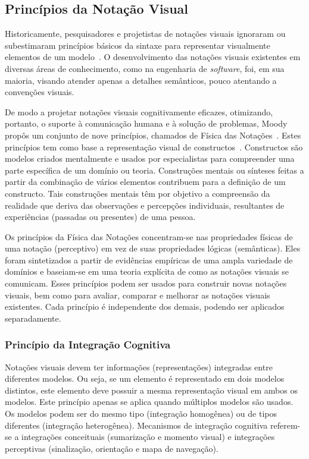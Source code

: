 \subsection{Princípios da Notação Visual}\label{2-fundamentacao-notacao-visual-principios}

Historicamente, pesquisadores e projetistas de notações visuais ignoraram ou subestimaram princípios básicos da sintaxe para representar visualmente elementos de um modelo~\cite{MOODY-2009-Physics-Notation}. O desenvolvimento das notações visuais existentes em diversas áreas de conhecimento, como na engenharia de \textit{software}, foi, em sua maioria, visando atender apenas a detalhes semânticos, pouco atentando a convenções visuais.

De modo a projetar notações visuais cognitivamente eficazes, otimizando, portanto, o suporte à comunicação humana e à solução de problemas, Moody propôs um conjunto de nove princípios, chamados de Física das Notações~\cite{MOODY-2009-Physics-Notation}. Estes princípios tem como base a representação visual de constructos~\cite{MOODY-2009-Physics-Notation, POPESCU-WEGMANN-2014-Using-Physics-of-Notation-SEAM}. Constructos são modelos criados mentalmente e usados por especialistas para compreender uma parte específica de um domínio ou teoria. Construções mentais ou sínteses feitas a partir da combinação de vários elementos contribuem para a definição de um constructo. Tais construções mentais têm por objetivo a compreensão da realidade que deriva das observações e percepções individuais, resultantes de experiências (passadas ou presentes) de uma pessoa.

Os princípios da Física das Notações concentram-se nas propriedades físicas de uma notação (perceptivo) em vez de suas propriedades lógicas (semânticas). Eles foram sintetizados a partir de evidências empíricas de uma ampla variedade de domínios e baseiam-se em uma teoria explícita de como as notações visuais se comunicam. Esses princípios podem ser usados para construir novas notações visuais, bem como para avaliar, comparar e melhorar as notações visuais existentes. Cada princípio é independente dos demais, podendo ser aplicados separadamente.

\subsubsection{Princípio da Integração Cognitiva}\label{2-fundamentacao-notacao-visual-principio-integracao-cognitiva}

Notações visuais devem ter informações (representações) integradas entre diferentes modelos. Ou seja, se um elemento é representado em dois modelos distintos, este elemento deve possuir a mesma representação visual em ambos os modelos. Este princípio apenas se aplica quando múltiplos modelos são usados. Os modelos podem ser do mesmo tipo (integração homogênea) ou de tipos diferentes (integração heterogênea). Mecanismos de integração cognitiva referem-se a integrações conceituais (sumarização e momento visual) e integrações perceptivas (sinalização, orientação e mapa de navegação).

